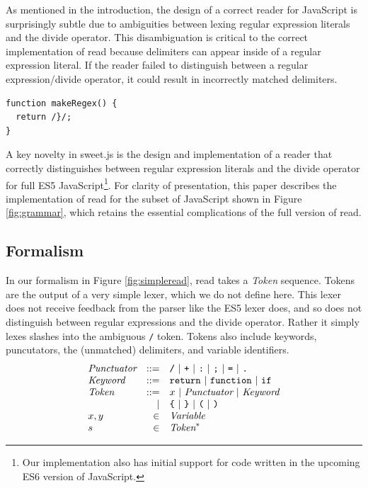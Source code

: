 \documentclass[preprint,10pt]{sigplanconf}
\begin{document}
As mentioned in the introduction, the design of a correct reader for JavaScript is surprisingly subtle due to ambiguities between lexing regular expression literals and the divide operator. This disambiguation is critical to the correct implementation of read because delimiters can appear inside of a regular expression literal. If the reader failed to distinguish between a regular expression/divide operator, it could result in incorrectly matched delimiters. 
\begin{lstlisting}
function makeRegex() {
  return /}/;  
}
\end{lstlisting}

A key novelty in sweet.js is the design and implementation of a reader
that correctly distinguishes between regular expression literals and
the divide operator for full ES5 JavaScript\footnote{Our
  implementation also has initial support for code written in the
  upcoming ES6 version of JavaScript.}. For clarity of presentation,
this paper describes the implementation of read for the subset of
JavaScript shown in Figure \ref{fig:grammar}, which retains the
essential complications of the full version of read.

\subsection{Formalism}

In our formalism in Figure \ref{fig:simpleread}, read takes a \textit{Token} sequence. Tokens are the output of a very simple lexer, which we do not define here. This lexer does not receive feedback from the parser like the ES5 lexer does, and so does not distinguish between regular expressions and the divide operator. Rather it simply lexes slashes into the ambiguous \texttt{/} token. Tokens also include keywords, puncutators, the (unmatched) delimiters, and variable identifiers.
\[
\begin{array}{lrl}
  \textit{Punctuator} &::=& \texttt{/} ~|~ \texttt{+} ~|~ \texttt{:} ~|~
  \texttt{;} ~|~ \texttt{=} ~|~ \texttt{.}
  \\
  \textit{Keyword} &::=& \texttt{return} ~|~ \texttt{function}~|~ \texttt{if}
  \\
  \textit{Token} &::=& x ~|~ \textit{Punctuator} ~|~ \textit{Keyword}
  \\
  &|& 
  \texttt{\{} ~|~ 
  \texttt {\}} ~|~  
  \texttt{(} ~|~ 
  \texttt{)}
  \\
  x, y &\in& \textit{Variable}
  \\
  s &\in& \textit{Token}^{*}
 \end{array}
\]
\end{document}
